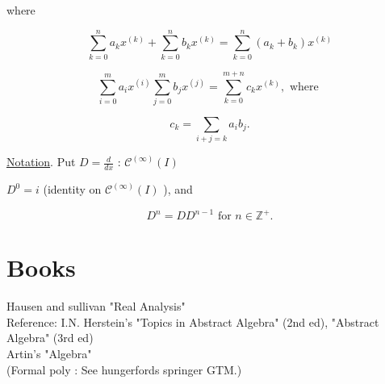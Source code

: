 \documentclass{article}
\theoremstyle{definition}
\begin{document}
 where

 \[ \sum_{k=0}^n a_kx^{(k)} + \sum_{k=0}^n b_kx^{(k)} = \sum_{k=0}^n
 (a_k + b_k)x^{(k)}   \]

 \[ \sum_{i=0}^m a_ix^{(i)} \sum_{j=0}^m b_jx^{(j)}  = \sum_{k=0}^{m+n}
 c_k x^{(k)}, \text{ where }\]

 \[ c_k = \sum_{i+j=k} a_ib_j .\]

 \underline{Notation}. Put \( D = \frac{d}{dx} \text{ : }
 \mathscr{C}^{(\infty)} (I)  \) 

 \( D^0 = i \) (identity on \(\mathscr{C}^{(\infty)} (I) \) ), and 

 \[ D^n = D D^{n-1} \text{ for } n \in \mathbb{Z}^+ .\]

 




\newpage
\section*{Books}
 Hausen and sullivan "Real Analysis" \\
 Reference: I.N. Herstein's "Topics in Abstract Algebra" (2nd ed),
 "Abstract Algebra" (3rd ed)\\
 Artin's "Algebra" \\
 (Formal poly : See hungerfords springer GTM.) \\









\end{document}
